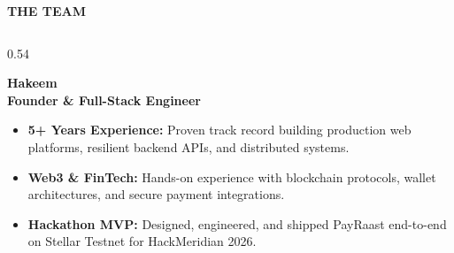 \documentclass[aspectratio=169, 10pt, t]{beamer}
\newcommand{\slidetitle}[1]{%
  \vspace*{0.35cm}%
  {\fontsize{13.5}{16}\selectfont\bfseries\textcolor{hmNavyText}{#1}\par}%
  \vspace{0.18cm}%
}
\begin{document}
\begin{frame}[plain]
  \slidetitle{THE TEAM}
  \begin{columns}[T]
    \begin{column}{0.54\textwidth}
      \begin{tcolorbox}[colframe=hmLightBorder, colback=hmWhite, boxrule=0.75pt,
        sharp corners, left=9pt, right=9pt, top=7pt, bottom=7pt, enhanced,
        drop fuzzy shadow=gray!12]
        
        \hspace{0.15cm}
        \begin{minipage}[b]{0.75\textwidth}
          {\fontsize{10}{12}\selectfont\bfseries\textcolor{hmNavyText}{Hakeem}}\\[0.03cm]
          {\fontsize{7}{8.5}\selectfont\bfseries\textcolor{hmYellowDark}{Founder \& Full-Stack Engineer}}
        \end{minipage}

        \vspace{0.20cm}
        {\fontsize{6.8}{9.2}\selectfont\textcolor{hmBodyText}{
          \begin{itemize}\setlength{\itemsep}{2.5pt}\setlength{\leftmargin}{10pt}
            \item[--] \textbf{5+ Years Experience:} Proven track record building production web platforms, resilient backend APIs, and distributed systems.
            \item[--] \textbf{Web3 \& FinTech:} Hands-on experience with blockchain protocols, wallet architectures, and secure payment integrations.
            \item[--] \textbf{Hackathon MVP:} Designed, engineered, and shipped PayRaast end-to-end on Stellar Testnet for HackMeridian 2026.
          \end{itemize}
        }}
      \end{tcolorbox}
    \end{column}


\end{columns}
\end{frame}
\end{document}
